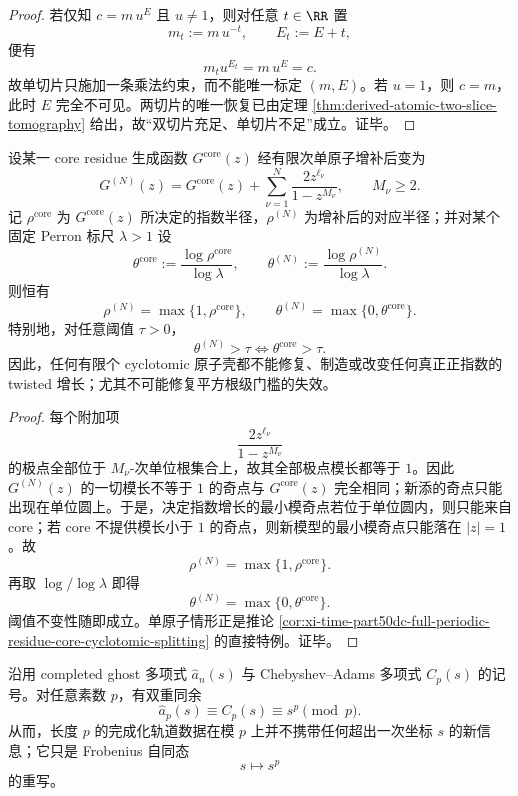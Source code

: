 \begin{proof}
若仅知 \(c=m\,u^E\) 且 \(u\neq 1\)，则对任意 \(t\in\RR\) 置
\[
m_t:=m\,u^{-t},
\qquad
E_t:=E+t,
\]
便有
\[
m_tu^{E_t}=m\,u^E=c.
\]
故单切片只施加一条乘法约束，而不能唯一标定 \((m,E)\)。若 \(u=1\)，则 \(c=m\)，此时 \(E\) 完全不可见。两切片的唯一恢复已由定理 \ref{thm:derived-atomic-two-slice-tomography} 给出，故“双切片充足、单切片不足”成立。证毕。
\end{proof}

\begin{theorem}\label{thm:derived-finite-cyclotomic-surgery-transparent}
设某一 core residue 生成函数 \(G^{\mathrm{core}}(z)\) 经有限次单原子增补后变为
\[
G^{(N)}(z)
=
G^{\mathrm{core}}(z)
+
\sum_{\nu=1}^{N}\frac{2z^{\ell_\nu}}{1-z^{M_\nu}},
\qquad M_\nu\ge 2.
\]
记 \(\rho^{\mathrm{core}}\) 为 \(G^{\mathrm{core}}(z)\) 所决定的指数半径，\(\rho^{(N)}\) 为增补后的对应半径；并对某个固定 Perron 标尺 \(\lambda>1\) 设
\[
\theta^{\mathrm{core}}
:=
\frac{\log \rho^{\mathrm{core}}}{\log\lambda},
\qquad
\theta^{(N)}
:=
\frac{\log \rho^{(N)}}{\log\lambda}.
\]
则恒有
\[
\rho^{(N)}=\max\{1,\rho^{\mathrm{core}}\},
\qquad
\theta^{(N)}=\max\{0,\theta^{\mathrm{core}}\}.
\]
特别地，对任意阈值 \(\tau>0\)，
\[
\theta^{(N)}>\tau
\iff
\theta^{\mathrm{core}}>\tau.
\]
因此，任何有限个 cyclotomic 原子壳都不能修复、制造或改变任何真正正指数的 twisted 增长；尤其不可能修复平方根级门槛的失效。
\end{theorem}

\begin{proof}
每个附加项
\[
\frac{2z^{\ell_\nu}}{1-z^{M_\nu}}
\]
的极点全部位于 \(M_\nu\)-次单位根集合上，故其全部极点模长都等于 \(1\)。因此 \(G^{(N)}(z)\) 的一切模长不等于 \(1\) 的奇点与 \(G^{\mathrm{core}}(z)\) 完全相同；新添的奇点只能出现在单位圆上。于是，决定指数增长的最小模奇点若位于单位圆内，则只能来自 core；若 core 不提供模长小于 \(1\) 的奇点，则新模型的最小模奇点只能落在 \(|z|=1\)。故
\[
\rho^{(N)}=\max\{1,\rho^{\mathrm{core}}\}.
\]
再取 \(\log/\log\lambda\) 即得
\[
\theta^{(N)}=\max\{0,\theta^{\mathrm{core}}\}.
\]
阈值不变性随即成立。单原子情形正是推论 \ref{cor:xi-time-part50dc-full-periodic-residue-core-cyclotomic-splitting} 的直接特例。证毕。
\end{proof}

\begin{theorem}\label{thm:derived-prime-length-completed-frobenius-collapse}
沿用 completed ghost 多项式 \(\widehat a_n(s)\) 与 Chebyshev--Adams 多项式 \(C_p(s)\) 的记号。对任意素数 \(p\)，有双重同余
\[
\widehat a_p(s)\equiv C_p(s)\equiv s^p \pmod p.
\]
从而，长度 \(p\) 的完成化轨道数据在模 \(p\) 上并不携带任何超出一次坐标 \(s\) 的新信息；它只是 Frobenius 自同态
\[
s\longmapsto s^p
\]
的重写。
\end{theorem}


